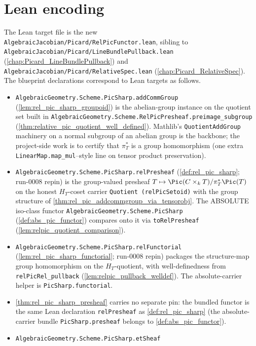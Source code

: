 \section{Lean encoding}
\label{sec:relpic_lean_encoding}

The Lean target file is the new
\texttt{AlgebraicJacobian/Picard/RelPicFunctor.lean}, sibling to
\texttt{AlgebraicJacobian/Picard/LineBundlePullback.lean}
(\cref{chap:Picard_LineBundlePullback}) and
\texttt{AlgebraicJacobian/Picard/RelativeSpec.lean}
(\cref{chap:Picard_RelativeSpec}). The blueprint declarations correspond to
Lean targets as follows.
\begin{itemize}
  \item \texttt{AlgebraicGeometry.Scheme.PicSharp.addCommGroup}
    (\cref{lem:rel_pic_sharp_groupoid}) is the abelian-group instance on the
    quotient set built in
    \texttt{AlgebraicGeometry.Scheme.RelPicPresheaf.preimage\_subgroup}
    (\cref{thm:relative_pic_quotient_well_defined}). Mathlib's
    \texttt{QuotientAddGroup} machinery on a normal subgroup of an abelian
    group is the backbone; the project-side work is to certify that
    \(\pi_T^*\) is a group homomorphism (one extra
    \texttt{LinearMap.map\_mul}--style line on tensor product preservation).
  \item \texttt{AlgebraicGeometry.Scheme.PicSharp.relPresheaf}
    (\cref{def:rel_pic_sharp}; run-0008 repin) is the group-valued presheaf
    \(T \mapsto \Pic(C \times_k T)/\pi_T^*\Pic(T)\) on the honest
    \(H_T\)-coset carrier \texttt{Quotient (relPicSetoid)} with the group
    structure of \cref{thm:rel_pic_addcommgroup_via_tensorobj}. The
    ABSOLUTE iso-class functor \texttt{AlgebraicGeometry.Scheme.PicSharp}
    (\cref{def:abs_pic_functor}) compares onto it via
    \texttt{toRelPresheaf} (\cref{lem:relpic_quotient_comparison}).
  \item \texttt{AlgebraicGeometry.Scheme.PicSharp.relFunctorial}
    (\cref{lem:rel_pic_sharp_functorial}; run-0008 repin) packages the
    structure-map group homomorphism on the \(H_T\)-quotient, with
    well-definedness from \texttt{relPicRel\_pullback}
    (\cref{lem:relpic_pullback_welldef}). The absolute-carrier helper is
    \texttt{PicSharp.functorial}.
  \item \cref{thm:rel_pic_sharp_presheaf} carries no separate pin: the
    bundled functor is the same Lean declaration \texttt{relPresheaf} as
    \cref{def:rel_pic_sharp} (the absolute-carrier bundle
    \texttt{PicSharp.presheaf} belongs to \cref{def:abs_pic_functor}).
  \item \texttt{AlgebraicGeometry.Scheme.PicSharp.etSheaf}

\end{itemize}
